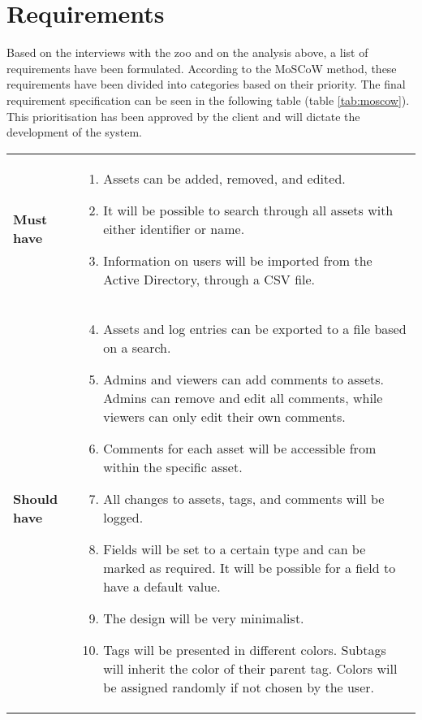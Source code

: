 \section{Requirements}\label{sc:requirements}
Based on the interviews with the zoo and on the analysis above, a list of requirements have been formulated. According to the MoSCoW \cite[chap 7.1]{DEB} method, these requirements have been divided into categories based on their priority. The final requirement specification can be seen in the following table (table \ref{tab:moscow}). This prioritisation has been approved by the client and will dictate the development of the system. 

\begin{longtable}{p{3.2cm} p{10cm}}
    \renewcommand{\arraystretch}{2.0}
        \\
        \hline
        \textbf{Must have} & 
        \vspace*{-7mm}
        \begin{enumerate} \itemsep0em 
            \item Assets can be added, removed, and edited.
            \item It will be possible to search through all assets with either identifier or name.
            \item Information on users will be imported from the Active Directory, through a CSV file.
        \end{enumerate}
        \\
        \hline
        
        \textbf{Should have} & 
        \vspace*{-7mm}
        \begin{enumerate} \setcounter{enumi}{3} \itemsep0em 
            \item Assets and log entries can be exported to a file based on a search.
            \item Admins and viewers can add comments to assets. Admins can remove and edit all comments, while viewers can only edit their own comments.
            \item Comments for each asset will be accessible from within the specific asset.
            \item All changes to assets, tags, and comments will be logged.
            \item Fields will be set to a certain type and can be marked as required. It will be possible for a field to have a default value.
            \item The design will be very minimalist.
            \item Tags will be presented in different colors. Subtags will inherit the color of their parent tag. Colors will be assigned randomly if not chosen by the user.
        \end{enumerate}
        \\
        \hline
        

\end{longtable}
